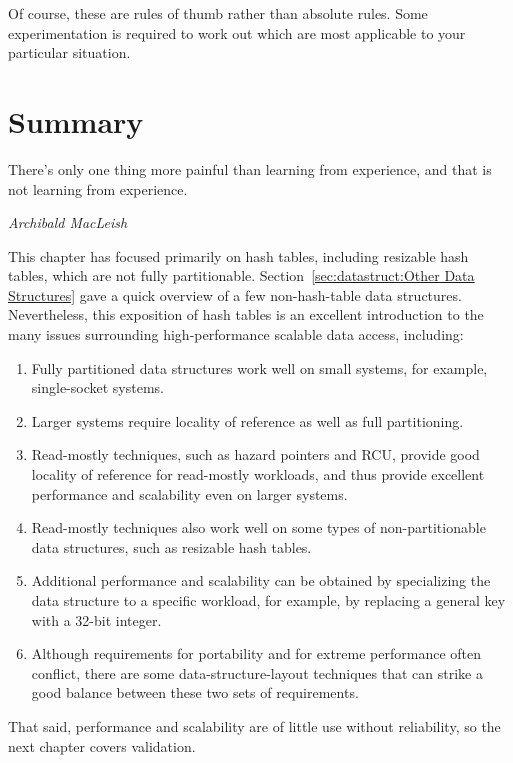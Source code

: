 Of course, these are rules of thumb rather than absolute rules.
Some experimentation is required to work out which are most applicable
to your particular situation.

\section{Summary}
\label{sec:datastruct:Summary}
%
\epigraph{There's only one thing more painful than learning from
	  experience, and that is not learning from experience.}
	 {\emph{Archibald MacLeish}}

This chapter has focused primarily on hash tables, including resizable
hash tables, which are not fully partitionable.
Section~\ref{sec:datastruct:Other Data Structures} gave a quick
overview of a few non-hash-table data structures.
Nevertheless, this exposition of hash tables is an excellent introduction
to the many issues surrounding high-performance scalable data access,
including:

\begin{enumerate}
\item	Fully partitioned data structures work well on small systems,
	for example, single-socket systems.
\item	Larger systems require locality of reference as well as
	full partitioning.
\item	Read-mostly techniques, such as hazard pointers and RCU,
	provide good locality of reference for read-mostly workloads,
	and thus provide excellent performance and scalability even
	on larger systems.
\item	Read-mostly techniques also work well on some types of
	non-partitionable data structures, such as resizable hash tables.
\item	Additional performance and scalability can be obtained by
	specializing the data structure to a specific workload,
	for example, by replacing a general key with a 32-bit integer.
\item	Although requirements for portability and for extreme performance
	often conflict, there are some data-structure-layout techniques
	that can strike a good balance between these two sets of
	requirements.
\end{enumerate}

That said, performance and scalability are of little use without reliability,
so the next chapter covers validation.

